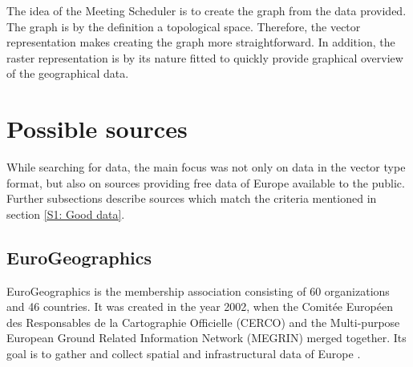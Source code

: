 \documentclass[thesis=M,english]{FITthesis}[2012/10/20]
\begin{document}


The idea of the Meeting Scheduler is to create the graph from the data provided. The graph is by the definition a topological space. Therefore, the vector representation makes creating the graph more straightforward. In addition, the raster representation is by its nature fitted to quickly provide graphical overview of the geographical data.

\section{Possible sources}
\label{sec:posSources}

While searching for data, the main focus was not only on data in the vector type format, but also on sources providing free data of Europe available to the public. Further subsections describe sources which match the criteria mentioned in section \ref{S1: Good data}.

 
\subsection{EuroGeographics}
EuroGeographics is the membership association consisting of 60 organizations and 46 countries. It was created in the year 2002, when the Comit{\' e}e Europ{\' e}en des Responsables de la Cartographie Officielle (CERCO) and the Multi-purpose European Ground Related Information Network (MEGRIN) merged together. Its goal is to gather and collect spatial and infrastructural data of Europe \cite{Euro16}. 
\end{document}

